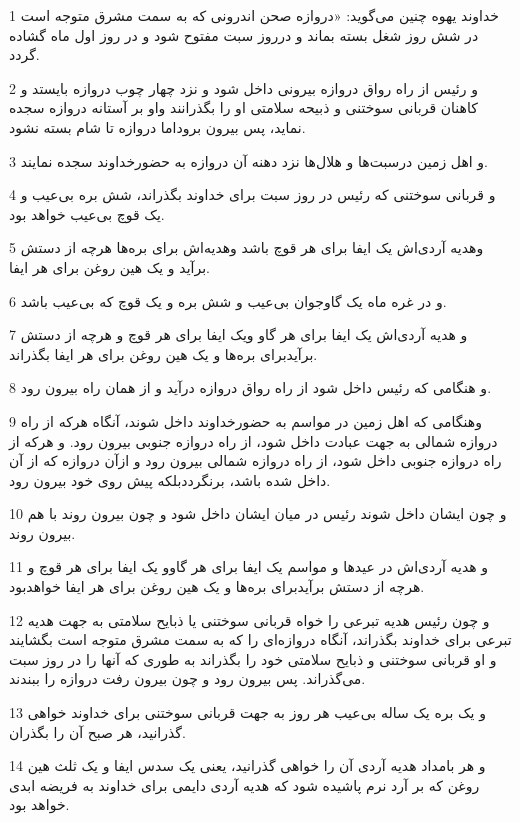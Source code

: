 \par 1 خداوند یهوه چنین می‌گوید: «دروازه صحن اندرونی که به سمت مشرق متوجه است در شش روز شغل بسته بماند و درروز سبت مفتوح شود و در روز اول ماه گشاده گردد.
\par 2 و رئیس از راه رواق دروازه بیرونی داخل شود و نزد چهار چوب دروازه بایستد و کاهنان قربانی سوختنی و ذبیحه سلامتی او را بگذرانند واو بر آستانه دروازه سجده نماید، پس بیرون بروداما دروازه تا شام بسته نشود.
\par 3 و اهل زمین درسبت‌ها و هلال‌ها نزد دهنه آن دروازه به حضورخداوند سجده نمایند.
\par 4 و قربانی سوختنی که رئیس در روز سبت برای خداوند بگذراند، شش بره بی‌عیب و یک قوچ بی‌عیب خواهد بود.
\par 5 وهدیه آردی‌اش یک ایفا برای هر قوچ باشد وهدیه‌اش برای بره‌ها هر‌چه از دستش برآید و یک هین روغن برای هر ایفا.
\par 6 و در غره ماه یک گاوجوان بی‌عیب و شش بره و یک قوچ که بی‌عیب باشد.
\par 7 و هدیه آردی‌اش یک ایفا برای هر گاو ویک ایفا برای هر قوچ و هر‌چه از دستش برآیدبرای بره‌ها و یک هین روغن برای هر ایفا بگذراند.
\par 8 و هنگامی که رئیس داخل شود از راه رواق دروازه درآید و از همان راه بیرون رود.
\par 9 وهنگامی که اهل زمین در مواسم به حضورخداوند داخل شوند، آنگاه هر‌که از راه دروازه شمالی به جهت عبادت داخل شود، از راه دروازه جنوبی بیرون رود. و هرکه از راه دروازه جنوبی داخل شود، از راه دروازه شمالی بیرون رود و ازآن دروازه که از آن داخل شده باشد، برنگرددبلکه پیش روی خود بیرون رود.
\par 10 و چون ایشان داخل شوند رئیس در میان ایشان داخل شود و چون بیرون روند با هم بیرون روند.
\par 11 و هدیه آردی‌اش در عیدها و مواسم یک ایفا برای هر گاوو یک ایفا برای هر قوچ و هر‌چه از دستش برآیدبرای بره‌ها و یک هین روغن برای هر ایفا خواهدبود.
\par 12 و چون رئیس هدیه تبرعی را خواه قربانی سوختنی یا ذبایح سلامتی به جهت هدیه تبرعی برای خداوند بگذراند، آنگاه دروازه‌ای را که به سمت مشرق متوجه است بگشایند و او قربانی سوختنی و ذبایح سلامتی خود را بگذراند به طوری که آنها را در روز سبت می‌گذراند. پس بیرون رود و چون بیرون رفت دروازه را ببندند.
\par 13 و یک بره یک ساله بی‌عیب هر روز به جهت قربانی سوختنی برای خداوند خواهی گذرانید، هر صبح آن را بگذران.
\par 14 و هر بامداد هدیه آردی آن را خواهی گذرانید، یعنی یک سدس ایفا و یک ثلث هین روغن که بر آرد نرم پاشیده شود که هدیه آردی دایمی برای خداوند به فریضه ابدی خواهد بود.
